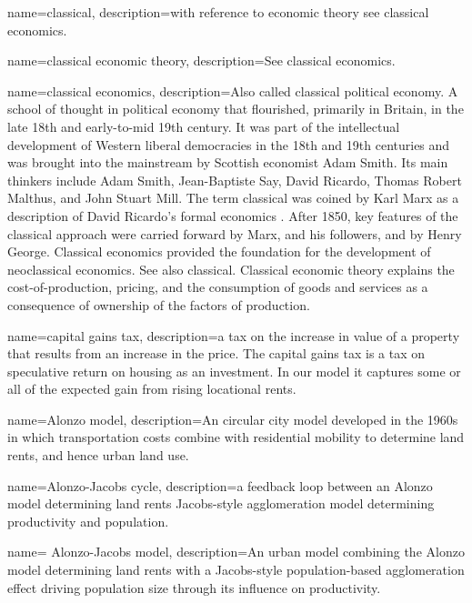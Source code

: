 {
name=classical,
description={with reference to economic theory see \gls{classical economics}.}
}

{
name=classical economic theory,
description={See \gls{classical economics}.}
}

{
name=classical economics,
description={Also called classical \gls{political economy}. %
A school of thought in political economy that flourished, primarily in Britain, in the late 18th and early-to-mid 19th century. It was part of the intellectual development of  Western liberal democracies in the 18th and 19th centuries and was brought into the mainstream by Scottish economist Adam Smith. Its main thinkers include Adam Smith, Jean-Baptiste Say, David Ricardo, Thomas Robert Malthus, and John Stuart Mill.  The term classical was coined by Karl Marx %
as a description of David Ricardo's formal economics \cite{colanderDeathNeoclassicalEconomics2000}. After 1850, key features of the classical approach were carried forward by Marx, and his followers, and by Henry George. Classical economics provided the foundation for the development of \gls{neoclassical economics}. See also \gls{classical}.  Classical economic theory explains the cost-of-production, pricing, and the consumption of goods and services as a consequence of ownership of the factors of production. }
}


{
name=capital gains tax,
description={a tax on the increase in value of a property that results from an increase in the price. The capital gains tax is a tax on speculative return on housing as an investment. In our model it captures some or all of the expected gain from rising \glspl{locational rent}.}
}

{
name=Alonzo model,
description={An circular city model developed in the 1960s in which transportation costs combine with residential mobility to determine land rents, and hence urban land use.}
}

{
name=Alonzo-Jacobs cycle,
description={a feedback loop between an \Gls{Alonzo model} determining land rents Jacobs-style \gls{agglomeration} model determining productivity and population.}
}

{
name= Alonzo-Jacobs model,
description={An urban model combining the Alonzo \cite{alonsoModelUrbanLand1960}model determining land rents with a Jacobs-style population-based \gls{agglomeration} effect \cite{jacobsEconomyCities1969} driving population size through its influence on productivity.}
}


